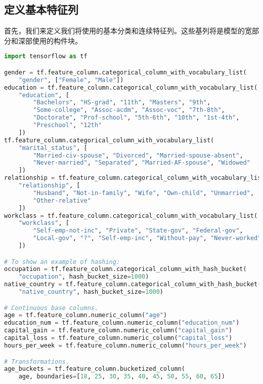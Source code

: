 \subsection{定义基本特征列}
首先，我们来定义我们将使用的基本分类和连续特征列。这些基列将是模型的宽部分和深部使用的构件块。
\begin{lstlisting}[language=Python]
import tensorflow as tf

gender = tf.feature_column.categorical_column_with_vocabulary_list(
    "gender", ["Female", "Male"])
education = tf.feature_column.categorical_column_with_vocabulary_list(
    "education", [
        "Bachelors", "HS-grad", "11th", "Masters", "9th",
        "Some-college", "Assoc-acdm", "Assoc-voc", "7th-8th",
        "Doctorate", "Prof-school", "5th-6th", "10th", "1st-4th",
        "Preschool", "12th"
    ])
tf.feature_column.categorical_column_with_vocabulary_list(
    "marital_status", [
        "Married-civ-spouse", "Divorced", "Married-spouse-absent",
        "Never-married", "Separated", "Married-AF-spouse", "Widowed"
    ])
relationship = tf.feature_column.categorical_column_with_vocabulary_list(
    "relationship", [
        "Husband", "Not-in-family", "Wife", "Own-child", "Unmarried",
        "Other-relative"
    ])
workclass = tf.feature_column.categorical_column_with_vocabulary_list(
    "workclass", [
        "Self-emp-not-inc", "Private", "State-gov", "Federal-gov",
        "Local-gov", "?", "Self-emp-inc", "Without-pay", "Never-worked"
    ])

# To show an example of hashing:
occupation = tf.feature_column.categorical_column_with_hash_bucket(
    "occupation", hash_bucket_size=1000)
native_country = tf.feature_column.categorical_column_with_hash_bucket(
    "native_country", hash_bucket_size=1000)

# Continuous base columns.
age = tf.feature_column.numeric_column("age")
education_num = tf.feature_column.numeric_column("education_num")
capital_gain = tf.feature_column.numeric_column("capital_gain")
capital_loss = tf.feature_column.numeric_column("capital_loss")
hours_per_week = tf.feature_column.numeric_column("hours_per_week")

# Transformations.
age_buckets = tf.feature_column.bucketized_column(
    age, boundaries=[18, 25, 30, 35, 40, 45, 50, 55, 60, 65])
\end{lstlisting}
